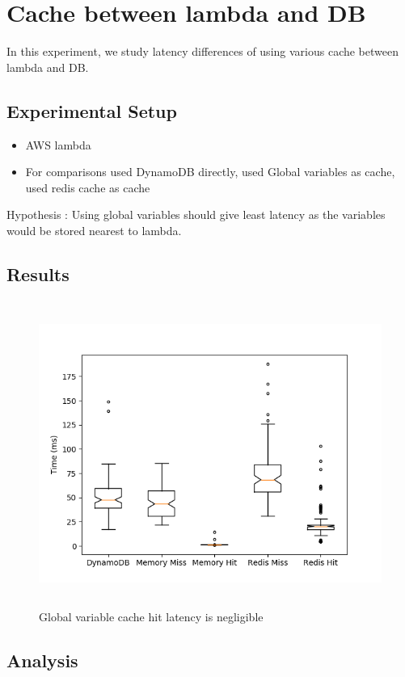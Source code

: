 \section{Cache between lambda and DB}

In this experiment, we study latency differences of using various cache between lambda and DB.

\subsection{Experimental Setup}
\begin{itemize}
    \item AWS lambda
    \item For comparisons used DynamoDB directly, used Global variables as cache, used redis cache as cache
\end{itemize}

Hypothesis : Using global variables should give least latency as the variables would be stored nearest to lambda.

\subsection{Results}

\begin{figure}[ht]
\centering
\includegraphics[height=10cm]{Images/3.png}
\caption{Global variable cache hit latency is negligible}
\end{figure}

\subsection{Analysis}

